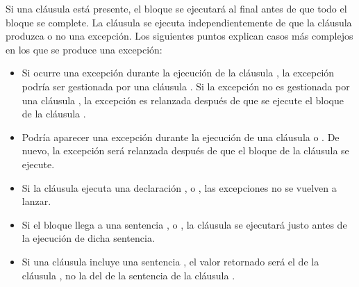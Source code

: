 \documentclass[a4,10pt,spanish]{sphinxmanual}
\begin{document}
\sphinxAtStartPar
Si una cláusula  está presente, el bloque  se ejecutará al final antes de que todo el bloque  se complete. La cláusula  se ejecuta independientemente de que la cláusula  produzca o no una excepción. Los siguientes puntos explican casos más complejos en los que se produce una excepción:
\begin{itemize}
\item {} 
\sphinxAtStartPar
Si ocurre una excepción durante la ejecución de la cláusula , la excepción podría ser gestionada por una cláusula . Si la excepción no es gestionada por una cláusula , la excepción es relanzada después de que se ejecute el bloque de la cláusula .

\item {} 
\sphinxAtStartPar
Podría aparecer una excepción durante la ejecución de una cláusula  o . De nuevo, la excepción será relanzada después de que el bloque de la cláusula  se ejecute.

\item {} 
\sphinxAtStartPar
Si la cláusula  ejecuta una declaración ,  o , las excepciones no se vuelven a lanzar.

\item {} 
\sphinxAtStartPar
Si el bloque  llega a una sentencia ,  o , la cláusula  se ejecutará justo antes de la ejecución de dicha sentencia.

\item {} 
\sphinxAtStartPar
Si una cláusula  incluye una sentencia , el valor retornado será el de la cláusula , no la del de la sentencia  de la cláusula .

\end{itemize}
\end{document}
